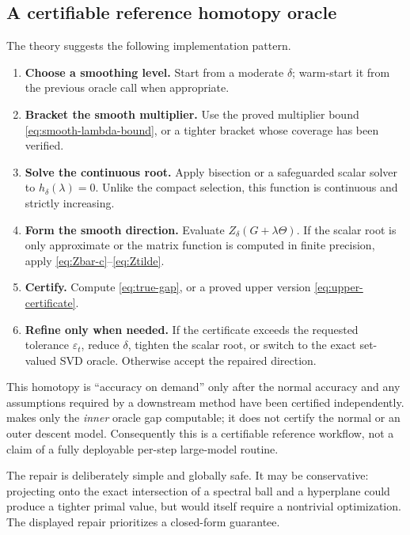 \subsection{A certifiable reference homotopy oracle}

The theory suggests the following implementation pattern.

\begin{enumerate}
  \item \textbf{Choose a smoothing level.}
        Start from a moderate \(\delta\); warm-start it from the previous
        oracle call when appropriate.
  \item \textbf{Bracket the smooth multiplier.}
        Use the proved multiplier bound
        \eqref{eq:smooth-lambda-bound}, or a tighter bracket whose coverage has
        been verified.
  \item \textbf{Solve the continuous root.}
        Apply bisection or a safeguarded scalar solver to
        \(h_\delta(\lambda)=0\).  Unlike the compact selection, this function
        is continuous and strictly increasing.
  \item \textbf{Form the smooth direction.}
        Evaluate \(Z_\delta(G+\lambda\Theta)\).  If the scalar root is only
        approximate or the matrix function is computed in finite precision,
        apply \eqref{eq:Zbar-c}--\eqref{eq:Ztilde}.
  \item \textbf{Certify.}
        Compute \eqref{eq:true-gap}, or a proved upper version
        \eqref{eq:upper-certificate}.
  \item \textbf{Refine only when needed.}
        If the certificate exceeds the requested tolerance \(\varepsilon_t\), reduce
        \(\delta\), tighten the scalar root, or switch to the exact
        set-valued SVD oracle.  Otherwise accept the repaired direction.
\end{enumerate}

This homotopy is ``accuracy on demand'' only after the normal accuracy and any
assumptions required by a downstream method have been certified independently.
 makes only the \emph{inner} oracle gap computable; it does not certify the
normal or an outer descent model.
Consequently this is a certifiable reference workflow, not a claim of a
fully deployable per-step large-model routine.

\begin{remark}[Conservatism]
The repair is deliberately simple and globally safe.  It may be conservative:
projecting onto the exact intersection of a spectral ball and a hyperplane
could produce a tighter primal value, but would itself require a nontrivial
optimization.  The displayed repair prioritizes a closed-form guarantee.
\end{remark}
